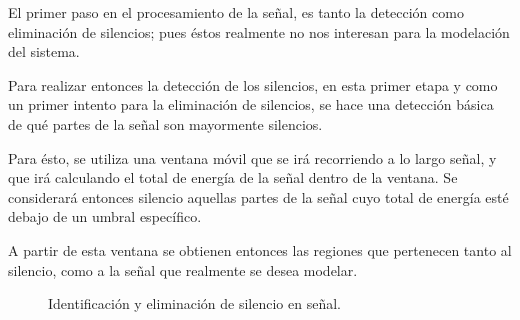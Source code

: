 El primer paso en el procesamiento de la señal, es tanto la detección como eliminación de silencios; pues éstos realmente no nos interesan para la modelación del sistema.


Para realizar entonces la detección de los silencios, en esta primer etapa y como un primer intento para la eliminación de silencios, se hace una detección básica de qué partes de la señal son mayormente silencios.

Para ésto, se utiliza una ventana móvil que se irá recorriendo a lo largo señal, y que irá calculando el total de energía de la señal dentro de la ventana. Se considerará entonces silencio aquellas partes de la señal cuyo total de energía esté debajo de un umbral específico.

A partir de esta ventana se obtienen entonces las regiones que pertenecen tanto al silencio, como a la señal que realmente se desea modelar.

\begin{figure}[bth]
  \myfloatalign
   \quad
  
   \quad
  
  \caption{Identificación y eliminación de silencio en señal.}
  \label{fig:sig_silence}
\end{figure}

